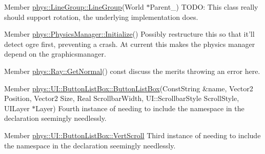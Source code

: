 \label{dd/da0/todo__todo000017}
\hypertarget{dd/da0/todo__todo000017}{}
 
\begin{DoxyDescription}
\item[Member \hyperlink{classphys_1_1LineGroup_a676039a6beec56d24c631e9da5fd7e76}{phys::LineGroup::LineGroup}(World $\ast$Parent\_\-) ]TODO: This class really should support rotation, the underlying implementation does. 
\end{DoxyDescription}

\label{dd/da0/todo__todo000022}
\hypertarget{dd/da0/todo__todo000022}{}
 
\begin{DoxyDescription}
\item[Member \hyperlink{classphys_1_1PhysicsManager_a28885be750bb763d957f122593815388}{phys::PhysicsManager::Initialize}() ]Possibly restructure this so that it'll detect ogre first, preventing a crash. At current this makes the physics manager depend on the graphicsmanager. 
\end{DoxyDescription}

\label{dd/da0/todo__todo000023}
\hypertarget{dd/da0/todo__todo000023}{}
 
\begin{DoxyDescription}
\item[Member \hyperlink{classphys_1_1Ray_a7445c25acb6ce865ef85e7ada829ccba}{phys::Ray::GetNormal}() const  ]discuss the merits throwing an error here. 
\end{DoxyDescription}

\label{dd/da0/todo__todo000024}
\hypertarget{dd/da0/todo__todo000024}{}
 
\begin{DoxyDescription}
\item[Member \hyperlink{classphys_1_1UI_1_1ButtonListBox_a1360d155570a277a169b54a6c85ace0d}{phys::UI::ButtonListBox::ButtonListBox}(ConstString \&name, Vector2 Position, Vector2 Size, Real ScrollbarWidth, UI::ScrollbarStyle ScrollStyle, UILayer $\ast$Layer) ]Fourth instance of needing to include the namespace in the declaration seemingly needlessly. 
\end{DoxyDescription}

\label{dd/da0/todo__todo000025}
\hypertarget{dd/da0/todo__todo000025}{}
 
\begin{DoxyDescription}
\item[Member \hyperlink{classphys_1_1UI_1_1ButtonListBox_aa47d94d75c58e3408a97766eace2c20e}{phys::UI::ButtonListBox::VertScroll} ]Third instance of needing to include the namespace in the declaration seemingly needlessly. 
\end{DoxyDescription}

